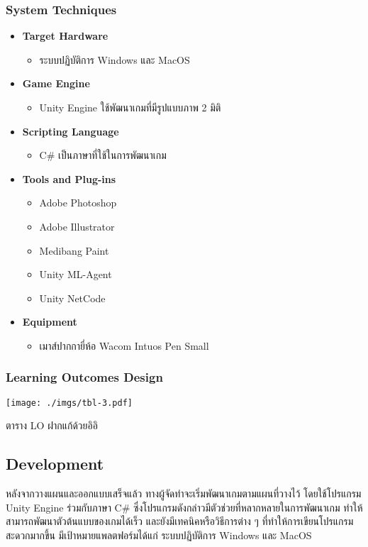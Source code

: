 \documentclass[12pt,oneside,openright,a4paper]{cpe-thai-project}
\begin{document}
\subsubsection{System Techniques}
\begin{itemize}
  \item \textbf{Target Hardware}
  \begin{itemize}
    \item ระบบปฏิบัติการ Windows และ MacOS
  \end{itemize} 
  \item \textbf{Game Engine}
  \begin{itemize}
    \item Unity Engine ใช้พัฒนาเกมที่มีรูปแบบภาพ 2 มิติ
  \end{itemize} 
  \item \textbf{Scripting Language}
  \begin{itemize}
    \item C\# เป็นภาษาที่ใช้ในการพัฒนาเกม
  \end{itemize} 
  \item \textbf{Tools and Plug-ins}
  \begin{itemize}
    \item Adobe Photoshop
    \item Adobe Illustrator
    \item Medibang Paint
    \item Unity ML-Agent
    \item Unity NetCode
  \end{itemize} 
  \item \textbf{Equipment}
  \begin{itemize}
    \item เมาส์ปากกายี่ห้อ Wacom Intuos Pen Small
  \end{itemize} 
\end{itemize}

\subsubsection{Learning Outcomes Design}
\begin{table}[H]
  \texttt{[image: ./imgs/tbl-3.pdf]}
  \caption{ตาราง LO ฝากแก้ด้วยอิอิ}\label{tbl:tab-3}
\end{table}

\subsection{Development}
หลังจากวางแผนและออกแบบเสร็จแล้ว ทางผู้จัดทำจะเริ่มพัฒนาเกมตามแผนที่วางไว้ 
โดยใช้โปรแกรม Unity Engine ร่วมกับภาษา C\# ซึ่งโปรแกรมดังกล่าวมีตัวช่วยที่หลากหลายในการพัฒนาเกม 
ทำให้สามารถพัฒนาตัวต้นแบบของเกมได้เร็ว และยังมีเทคนิคหรือวิธีการต่าง ๆ ที่ทำให้การเขียนโปรแกรมสะดวกมากขึ้น 
มีเป้าหมายแพลตฟอร์มได้แก่ ระบบปฏิบัติการ Windows และ MacOS
\end{document}
